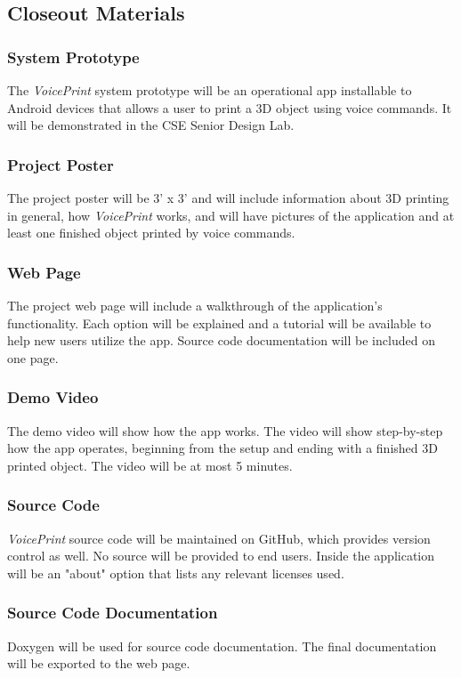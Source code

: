 \subsection{Closeout Materials}

\subsubsection{System Prototype}
The \textit{VoicePrint} system prototype will be an operational app installable to Android devices that allows a user to print a 3D object using voice commands. It will be demonstrated in the CSE Senior Design Lab.

\newpage\subsubsection{Project Poster}
The project poster will be 3' x 3' and will include information about 3D printing in general, how \textit{VoicePrint} works, and will have pictures of the application and at least one finished object printed by voice commands.

\subsubsection{Web Page}
The project web page will include a walkthrough of the application's functionality. Each option will be explained and a tutorial will be available to help new users utilize the app. Source code documentation will be included on one page.

\subsubsection{Demo Video}
The demo video will show how the app works. The video will show step-by-step how the app operates, beginning from the setup and ending with a finished 3D printed object. The video will be at most 5 minutes.

\subsubsection{Source Code}
\textit{VoicePrint} source code will be maintained on GitHub, which provides version control as well. No source will be provided to end users.  Inside the application will be an "about" option that lists any relevant licenses used.

\subsubsection{Source Code Documentation}
Doxygen will be used for source code documentation. The final documentation will be exported to the web page.

